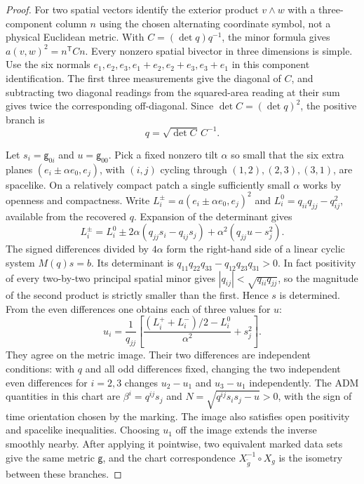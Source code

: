 \documentclass[11pt]{article}
\newcommand{\gmark}{\mathsf g}
\begin{document}
\begin{proof}
For two spatial vectors identify the exterior product \(v\wedge w\) with a three-component column \(n\) using the chosen alternating coordinate symbol, not a physical Euclidean metric. With \(C=(\det q)q^{-1}\), the minor formula gives \(a(v,w)^2=n^{\mathsf T} C n\). Every nonzero spatial bivector in three dimensions is simple. Use the six normals \(e_1,e_2,e_3,e_1+e_2,e_2+e_3,e_3+e_1\) in this component identification. The first three measurements give the diagonal of \(C\), and subtracting two diagonal readings from the squared-area reading at their sum gives twice the corresponding off-diagonal. Since \(\det C=(\det q)^2\), the positive branch is
\begin{equation}
 q=\sqrt{\det C}\,C^{-1}.
 \label{q}
\end{equation}

Let \(s_i=\gmark_{0i}\) and \(u=\gmark_{00}\). Pick a fixed nonzero tilt \(\alpha\) so small that the six extra planes \((e_i\pm\alpha e_0,e_j)\), with \((i,j)\) cycling through \((1,2),(2,3),(3,1)\), are spacelike. On a relatively compact patch a single sufficiently small \(\alpha\) works by openness and compactness. Write \(L_i^\pm=a(e_i\pm\alpha e_0,e_j)^2\) and \(L_i^0=q_{ii}q_{jj}-q_{ij}^2\), available from the recovered \(q\). Expansion of the determinant gives
\begin{equation}
 L_i^\pm=L_i^0\pm 2\alpha(q_{jj}s_i-q_{ij}s_j)
                 +\alpha^2(q_{jj}u-s_j^2).
 \label{tilt}
\end{equation}
The signed differences divided by \(4\alpha\) form the right-hand side of a linear cyclic system \(M(q)s=b\). Its determinant is
\(q_{11}q_{22}q_{33}-q_{12}q_{23}q_{31}>0\).
In fact positivity of every two-by-two principal spatial minor gives
\(|q_{ij}|<\sqrt{q_{ii}q_{jj}}\), so the magnitude of the second product is strictly smaller than the first. Hence \(s\) is determined. From the even differences one obtains each of three values for \(u\):
\begin{equation}
 u_i=\frac{1}{q_{jj}}\left[
 \frac{(L_i^++L_i^-)/2-L_i^0}{\alpha^2}+s_j^2
 \right].
 \label{u}
\end{equation}
They agree on the metric image. Their two differences are independent conditions: with \(q\) and all odd differences fixed, changing the two independent even differences for \(i=2,3\) changes \(u_2-u_1\) and \(u_3-u_1\) independently. The ADM quantities in this chart are \(\beta^i=q^{ij}s_j\) and \(N=\sqrt{q^{ij}s_i s_j-u}>0\), with the sign of time orientation chosen by the marking. The image also satisfies open positivity and spacelike inequalities. Choosing \(u_1\) off the image extends the inverse smoothly nearby. After applying it pointwise, two equivalent marked data sets give the same metric \(\gmark\), and the chart correspondence \(X_{\widetilde g}^{-1}\circ X_g\) is the isometry between these branches.
\end{proof}
\end{document}
